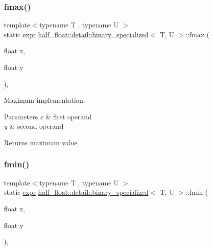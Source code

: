 \subsubsection{\texorpdfstring{fmax()}{fmax()}}
{\footnotesize\ttfamily template$<$typename T , typename U $>$ \\
static \hyperlink{structhalf__float_1_1detail_1_1expr}{expr} \hyperlink{structhalf__float_1_1detail_1_1binary__specialized}{half\+\_\+float\+::detail\+::binary\+\_\+specialized}$<$ T, U $>$\+::fmax (\begin{DoxyParamCaption}\item[{float}]{x,  }\item[{float}]{y }\end{DoxyParamCaption})\hspace{0.3cm}{\ttfamily [inline]}, {\ttfamily [static]}}

Maximum implementation. 
\begin{DoxyParams}{Parameters}
{\em x} & first operand \\
\hline
{\em y} & second operand \\
\hline
\end{DoxyParams}
\begin{DoxyReturn}{Returns}
maximum value 
\end{DoxyReturn}
\mbox{\label{structhalf__float_1_1detail_1_1binary__specialized_afb9ec4bebd2df86f570d20a6e7c6392f}} 
\subsubsection{\texorpdfstring{fmin()}{fmin()}}
{\footnotesize\ttfamily template$<$typename T , typename U $>$ \\
static \hyperlink{structhalf__float_1_1detail_1_1expr}{expr} \hyperlink{structhalf__float_1_1detail_1_1binary__specialized}{half\+\_\+float\+::detail\+::binary\+\_\+specialized}$<$ T, U $>$\+::fmin (\begin{DoxyParamCaption}\item[{float}]{x,  }\item[{float}]{y }\end{DoxyParamCaption})\hspace{0.3cm}{\ttfamily [inline]}, {\ttfamily [static]}}

